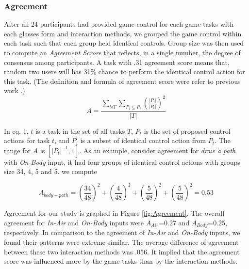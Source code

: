 \documentclass{sigchi}
\begin{document}
   \subsubsection{Agreement}
   After all 24 participants had provided game control for each game tasks with each glasses form and interaction methods, we grouped the game control within each task such that each group held identical controls. Group size was then used to compute an \emph{Agreement Scrore} that reflects, in a single number, the degree of consensus among participants. A task with .31 agreement score means that, random two users will has 31\% chance to perform the identical control action for this task. (The definition and formula of agreement score were refer to previous work \cite{Wobbrock:2005:MGS:1056808.1057043}.)
   \begin{equation}
   A = \frac{\displaystyle{\sum_{t\epsilon T }} \sum_{P_i \subseteq P_t } \left(\frac{\lvert{P_i}\rvert}{\lvert{P_t}\rvert}\right) ^ 2}{\displaystyle{\lvert{T}\rvert}}
   \end{equation}
  
   In eq. 1, $t$ is a task in the set of all tasks $T$, $P_{t}$ is the set of proposed control actions for task $t$, and $P_i$ is a subset of identical control action from $P_{t}$. The range for $A$ is $\left[\lvert{P_t}\rvert ^{-1}, 1\right]$. As an example, consider agreement for \emph{draw a path} with \emph{On-Body} input, it had four groups of identical control actions with groups size 34, 4, 5 and 5. we compute

   \begin{equation}
   A_{body-path} = \left(\frac{34}{48}\right) ^ 2  + \left(\frac{4}{48}\right) ^ 2 + \left(\frac{5}{48}\right) ^ 2 + \left(\frac{5}{48}\right) ^ 2 = 0.53
   \end{equation}

 Agreement for our study is graphed in Figure \ref{fig:Agreement}. The overall agreement for \emph{In-Air} and \emph{On-Body} inputs were $A_{Air}$=0.27 and $A_{Body}$=0.25, respectively. In comparison to the agreement of \emph{In-Air} and \emph{On-Body} inputs, we found their patterns were extreme similar. The average difference of agreement between these two interaction methods was .056. It implied that the agreement score was influenced more by the game tasks than by the interaction methods.
\end{document}
